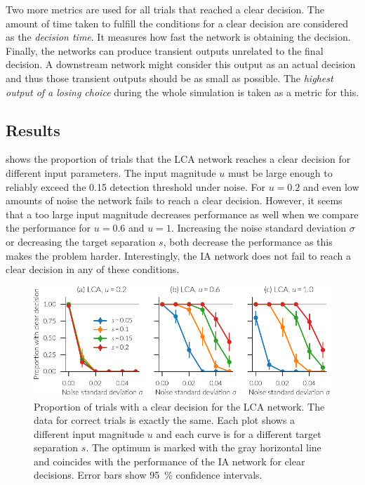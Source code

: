 Two more metrics are used for all trials that reached a clear decision.
The amount of time taken to fulfill the conditions for a clear decision are considered as the \emph{decision time}.
It measures how fast the network is obtaining the decision.
Finally, the networks can produce transient outputs unrelated to the final decision.
A downstream network might consider this output as an actual decision and thus those transient outputs should be as small as possible.
The \emph{highest output of a losing choice} during the whole simulation is taken as a metric for this.


\subsection{Results}
 shows the proportion of trials that the LCA network reaches a clear decision for different input parameters.
The input magnitude $u$ must be large enough to reliably exceed the \num{0.15} detection threshold under noise.
For $u = 0.2$ and even low amounts of noise the network fails to reach a clear decision.
However, it seems that a too large input magnitude decreases performance as well when we compare the performance for $u=0.6$ and $u=1$.
Increasing the noise standard deviation $\sigma$ or decreasing the target separation $s$, both decrease the performance as this makes the problem harder.
Interestingly, the IA network does not fail to reach a clear decision in any of these conditions.
\begin{figure}
    \centering
    \includegraphics{figures/ia-clear}
    \caption[Proportion of trials with a clear decision for the LCA network]{Proportion of trials with a clear decision for the LCA network. The data for correct trials is exactly the same. Each plot shows a different input magnitude $u$ and each curve is for a different target separation $s$. The optimum is marked with the gray horizontal line and coincides with the performance of the IA network for clear decisions. Error bars show \SI{95}{\percent} confidence intervals.}\label{fig:ia-clear}
\end{figure}


